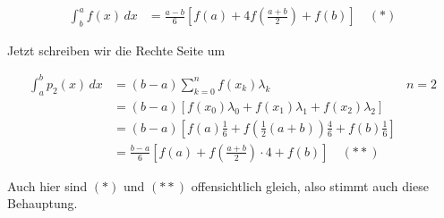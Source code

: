 \documentclass[ngerman,a4paper]{scrartcl}
\begin{document}
\begin{align*}
  \int^a_b f(x)\, dx &= \frac{a-b}{6} \left[ f(a) +
    4f\left(\frac{a+b}{2}\right) + f(b)\right] \quad (*)
\end{align*}

Jetzt schreiben wir die Rechte Seite um

\begin{align*}
  \int^b_a p_2(x)\, dx &= (b-a) \sum^n_{k=0} f(x_k) \lambda_k & n = 2\\
  &= (b-a)\left[f(x_0)\lambda_0 + f\left(x_1\right)\lambda_1 +
    f(x_2)\lambda_2\right]\\
  &= (b-a)\left[f(a)\frac{1}{6} +
    f\left(\frac{1}{2}(a+b)\right)\frac{4}{6} +
    f(b)\frac{1}{6}\right]\\
  &= \frac{b-a}{6} \left[f(a) + f\left(\frac{a+b}{2}\right)\cdot 4 +
    f(b) \right] \quad (**)
\end{align*}

Auch hier sind $(*)$ und $(**)$ offensichtlich gleich, also stimmt
auch diese Behauptung.
\end{document}
